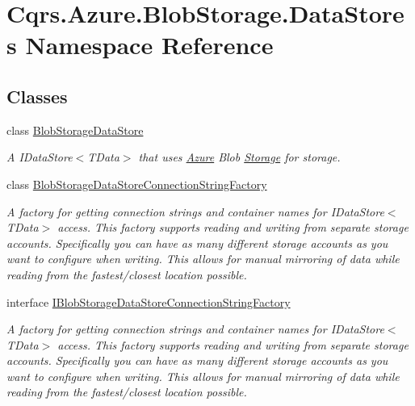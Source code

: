 \hypertarget{namespaceCqrs_1_1Azure_1_1BlobStorage_1_1DataStores}{}\section{Cqrs.\+Azure.\+Blob\+Storage.\+Data\+Stores Namespace Reference}
\label{namespaceCqrs_1_1Azure_1_1BlobStorage_1_1DataStores}
\subsection*{Classes}
\begin{DoxyCompactItemize}
\item 
class \hyperlink{classCqrs_1_1Azure_1_1BlobStorage_1_1DataStores_1_1BlobStorageDataStore}{Blob\+Storage\+Data\+Store}
\begin{DoxyCompactList}\small\item\em A I\+Data\+Store$<$\+T\+Data$>$ that uses \hyperlink{namespaceCqrs_1_1Azure}{Azure} Blob \hyperlink{namespaceCqrs_1_1Azure_1_1Storage}{Storage} for storage. \end{DoxyCompactList}\item 
class \hyperlink{classCqrs_1_1Azure_1_1BlobStorage_1_1DataStores_1_1BlobStorageDataStoreConnectionStringFactory}{Blob\+Storage\+Data\+Store\+Connection\+String\+Factory}
\begin{DoxyCompactList}\small\item\em A factory for getting connection strings and container names for I\+Data\+Store$<$\+T\+Data$>$ access. This factory supports reading and writing from separate storage accounts. Specifically you can have as many different storage accounts as you want to configure when writing. This allows for manual mirroring of data while reading from the fastest/closest location possible. \end{DoxyCompactList}\item 
interface \hyperlink{interfaceCqrs_1_1Azure_1_1BlobStorage_1_1DataStores_1_1IBlobStorageDataStoreConnectionStringFactory}{I\+Blob\+Storage\+Data\+Store\+Connection\+String\+Factory}
\begin{DoxyCompactList}\small\item\em A factory for getting connection strings and container names for I\+Data\+Store$<$\+T\+Data$>$ access. This factory supports reading and writing from separate storage accounts. Specifically you can have as many different storage accounts as you want to configure when writing. This allows for manual mirroring of data while reading from the fastest/closest location possible. \end{DoxyCompactList}\item 

\end{DoxyCompactItemize}
